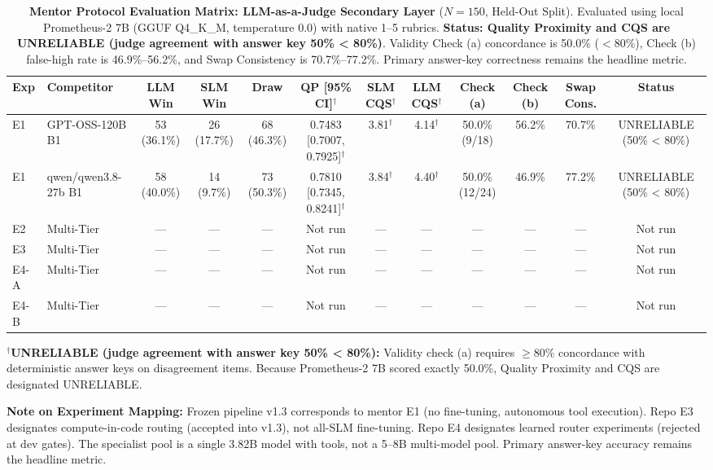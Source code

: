 \begin{table}[t]
\centering
\small
\caption{\textbf{Mentor Protocol Evaluation Matrix: LLM-as-a-Judge Secondary Layer} ($N=150$, Held-Out Split). Evaluated using local Prometheus-2 7B (GGUF Q4\_K\_M, temperature 0.0) with native 1–5 rubrics. \textbf{Status: Quality Proximity and CQS are UNRELIABLE (judge agreement with answer key 50\% < 80\%)}. Validity Check (a) concordance is 50.0\% ($< 80\%$), Check (b) false-high rate is 46.9\%--56.2\%, and Swap Consistency is 70.7\%--77.2\%. Primary answer-key correctness remains the headline metric.}
\label{tab:mentor_protocol_results}
\begin{tabular}{llcccccccccc}
\toprule
\textbf{Exp} & \textbf{Competitor} & \textbf{LLM Win} & \textbf{SLM Win} & \textbf{Draw} & \textbf{QP [95\% CI]$^\dagger$} & \textbf{SLM CQS$^\dagger$} & \textbf{LLM CQS$^\dagger$} & \textbf{Check (a)} & \textbf{Check (b)} & \textbf{Swap Cons.} & \textbf{Status} \\
\midrule
E1 & GPT-OSS-120B B1 & 53 (36.1\%) & 26 (17.7\%) & 68 (46.3\%) & 0.7483 [0.7007, 0.7925]$^\dagger$ & 3.81$^\dagger$ & 4.14$^\dagger$ & 50.0\% (9/18) & 56.2\% & 70.7\% & UNRELIABLE (50\% < 80\%) \\
E1 & qwen/qwen3.8-27b B1 & 58 (40.0\%) & 14 (9.7\%) & 73 (50.3\%) & 0.7810 [0.7345, 0.8241]$^\dagger$ & 3.84$^\dagger$ & 4.40$^\dagger$ & 50.0\% (12/24) & 46.9\% & 77.2\% & UNRELIABLE (50\% < 80\%) \\
E2 & Multi-Tier & — & — & — & Not run & — & — & — & — & — & Not run \\
E3 & Multi-Tier & — & — & — & Not run & — & — & — & — & — & Not run \\
E4-A & Multi-Tier & — & — & — & Not run & — & — & — & — & — & Not run \\
E4-B & Multi-Tier & — & — & — & Not run & — & — & — & — & — & Not run \\
\bottomrule
\end{tabular}
\begin{tablenotes}
\small
\item $^\dagger$\textbf{UNRELIABLE (judge agreement with answer key 50\% < 80\%):} Validity check (a) requires $\ge 80\%$ concordance with deterministic answer keys on disagreement items. Because Prometheus-2 7B scored exactly 50.0\%, Quality Proximity and CQS are designated UNRELIABLE.
\item \textbf{Note on Experiment Mapping:} Frozen pipeline v1.3 corresponds to mentor E1 (no fine-tuning, autonomous tool execution). Repo E3 designates compute-in-code routing (accepted into v1.3), not all-SLM fine-tuning. Repo E4 designates learned router experiments (rejected at dev gates). The specialist pool is a single 3.82B model with tools, not a 5–8B multi-model pool. Primary answer-key accuracy remains the headline metric.
\end{tablenotes}
\end{table}

